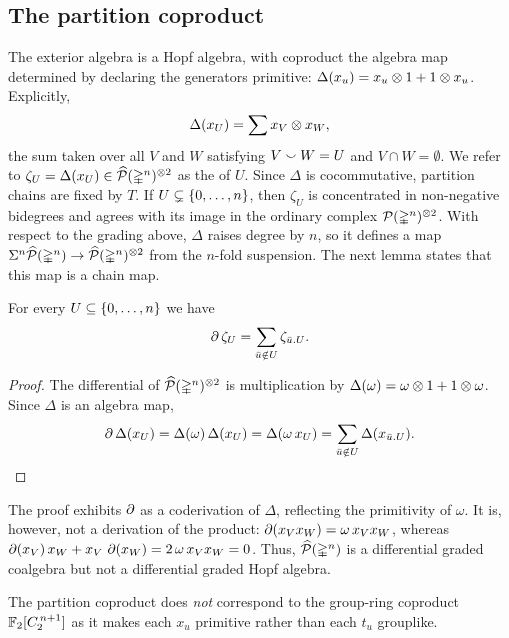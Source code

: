 \subsection{The partition coproduct}

The exterior algebra is a Hopf algebra, with coproduct the algebra map determined by declaring the generators primitive: $\Delta(x_u) = x_u \otimes 1 + 1 \otimes x_u$.
Explicitly,
\[
\Delta(x_U) = \sum x_V \otimes x_W,
\]
the sum taken over all $V$ and $W$ satisfying $V \union W = U$ and $V \cap W = \emptyset$.
We refer to $\zeta_U = \Delta(x_U) \in \widehat{\mathcal{P}}(\mathbb{\Delta}^n)^{\otimes 2}$ as the  of $U$.
Since $\Delta$ is cocommutative, partition chains are fixed by $T$.
If $U \subsetneq \{0,\dots,n\}$, then $\zeta_U$ is concentrated in non-negative bidegrees and agrees with its image in the ordinary complex $\mathcal{P}(\mathbb{\Delta}^n)^{\otimes 2}$.
With respect to the grading above, $\Delta$ raises degree by $n$, so it defines a map $\Sigma^n \widehat{\mathcal{P}}(\mathbb{\Delta}^n) \to \widehat{\mathcal{P}}(\mathbb{\Delta}^n)^{\otimes 2}$ from the $n$-fold suspension.
The next lemma states that this map is a chain map.

\begin{lemma}\label{c:boundary_partition_chain}
	For every $U \subseteq \{0,\dots,n\}$ we have
	\begin{equation}\label{eq:boundary_partition_chain}
		\operatorname{\partial}\zeta_U = \sum_{\bar u \notin U} \zeta_{\bar u.U}.
	\end{equation}
\end{lemma}

\begin{proof}
	The differential of $\widehat{\mathcal{P}}(\mathbb{\Delta}^n)^{\otimes 2}$ is multiplication by $\Delta(\omega) = \omega \otimes 1 + 1 \otimes \omega$.
	Since $\Delta$ is an algebra map,
	\[
	\operatorname{\partial} \Delta(x_U) = \Delta(\omega)\, \Delta(x_U) = \Delta(\omega\, x_U) = \sum_{\bar u \notin U} \Delta(x_{\bar u.U}). \qedhere
	\]
\end{proof}

The proof exhibits $\operatorname{\partial}$ as a coderivation of $\Delta$, reflecting the primitivity of $\omega$.
It is, however, not a derivation of the product: $\operatorname{\partial}(x_V x_W) = \omega\, x_V x_W$, whereas $\operatorname{\partial}(x_V)\, x_W + x_V\, \operatorname{\partial}(x_W) = 2\, \omega\, x_V x_W = 0$.
Thus, $\widehat{\mathcal{P}}(\mathbb{\Delta}^n)$ is a differential graded coalgebra but not a differential graded Hopf algebra.

\begin{remark*}
	The partition coproduct does \emph{not} correspond to the group-ring coproduct ${\mathbb{F}_2}[C_2^{\, n+1}]$ as it makes each $x_u$ primitive rather than each $t_u$ grouplike.
\end{remark*}


